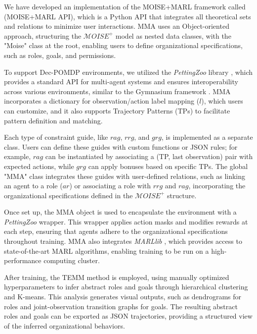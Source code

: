 \documentclass[conference]{IEEEtran}
\begin{document}
We have developed an implementation of the MOISE+MARL framework called ~\hyperref[fn:github]{\footnotemark[1]} (MOISE+MARL API), which is a Python API that integrates all theoretical sets and relations to minimize user interactions. MMA uses an Object-oriented approach, structuring the $\mathcal{M}OISE^+$ model as nested data classes, with the "Moise" class at the root, enabling users to define organizational specifications, such as roles, goals, and permissions.

To support Dec-POMDP environments, we utilized the \textit{PettingZoo} library \cite{terry2020pettingzoo}, which provides a standard API for multi-agent systems and ensures interoperability across various environments, similar to the Gymnasium framework \cite{kwiatkowski2024}. MMA incorporates a dictionary for observation/action label mapping ($l$), which users can customize, and it also supports Trajectory Patterns (TPs) to facilitate pattern definition and matching.

Each type of constraint guide, like $rag$, $rrg$, and $grg$, is implemented as a separate class. Users can define these guides with custom functions or JSON rules; for example, $rag$ can be instantiated by associating a (TP, last observation) pair with expected actions, while $grg$ can apply bonuses based on specific TPs. The global "MMA" class integrates these guides with user-defined relations, such as linking an agent to a role ($ar$) or associating a role with $rrg$ and $rag$, incorporating the organizational specifications defined in the $\mathcal{M}OISE^+$ structure.

Once set up, the MMA object is used to encapsulate the environment with a \textit{PettingZoo} wrapper. This wrapper applies action masks and modifies rewards at each step, ensuring that agents adhere to the organizational specifications throughout training. MMA also integrates \textit{MARLlib} \cite{hu2021marlib}, which provides access to state-of-the-art MARL algorithms, enabling training to be run on a high-performance computing cluster.

After training, the TEMM method is employed, using manually optimized hyperparameters to infer abstract roles and goals through hierarchical clustering and K-means. This analysis generates visual outputs, such as dendrograms for roles and joint-observation transition graphs for goals. The resulting abstract roles and goals can be exported as JSON trajectories, providing a structured view of the inferred organizational behaviors.
\end{document}
